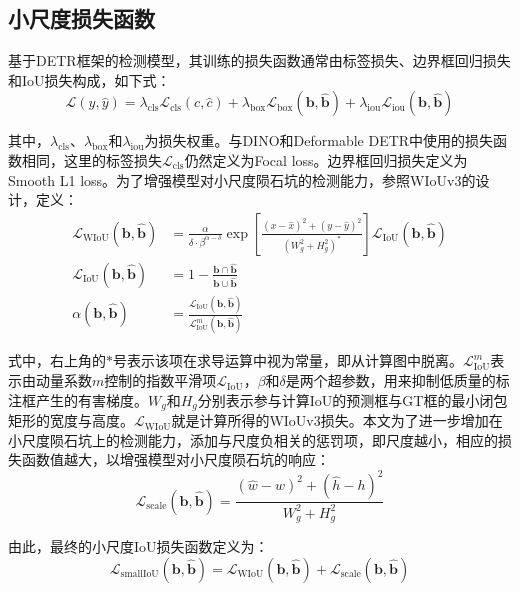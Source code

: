 \subsection{小尺度损失函数}
基于DETR框架的检测模型，其训练的损失函数通常由标签损失、边界框回归损失和IoU损失构成，如下式：
\begin{equation}
    \mathcal{L}(y,\hat{y}) = \lambda_{\text{cls}}\mathcal{L}_{\text{cls}}(c,\hat{c}) +  \lambda_{\text{box}}\mathcal{L}_{\text{box}}(\mathbf{b},\mathbf{\hat{b}}) +  \lambda_{\text{iou}}\mathcal{L}_{\text{iou}}(\mathbf{b},\mathbf{\hat{b}})
  \label{eq:detr-loss}
\end{equation}\par
其中，$\lambda_{\text{cls}}$、$\lambda_{\text{box}}$和$\lambda_{\text{iou}}$为损失权重。与DINO\cite{zhangDINODETRImproved2023}和Deformable DETR\cite{zhuDeformableDETRDeformable2021}中使用的损失函数相同，这里的标签损失$\mathcal{L}_\text{cls}$仍然定义为Focal loss\cite{linFocalLossDense2017}。边界框回归损失定义为Smooth L1 loss。为了增强模型对小尺度陨石坑的检测能力，参照WIoUv3\cite{tongWiseIoUBoundingBox2023}的设计，定义：
\begin{align}
  \mathcal{L}_\text{WIoU}(\mathbf{b},\mathbf{\hat{b}}) &=\frac{\alpha}{\delta\cdot\beta^{\alpha-\delta}}\exp\left[\frac{(x-\hat{x})^2+(y-\hat{y})^2}{(W_g^2+H_g^2)^*}\right]\mathcal{L}_\text{IoU}(\mathbf{b},\mathbf{\hat{b}})\\
  \mathcal{L}_\text{IoU}(\mathbf{b},\mathbf{\hat{b}}) &=1-\frac{\mathbf{b}\cap\mathbf{\hat{b}}}{\mathbf{b}\cup\mathbf{\hat{b}}}\\
  \alpha(\mathbf{b},\mathbf{\hat{b}})&= \frac{\mathcal{L}_\text{IoU}(\mathbf{b},\mathbf{\hat{b}})}{\mathcal{L}^m_\text{IoU}(\mathbf{b},\mathbf{\hat{b}})}
\end{align}\par
式中，右上角的$*$号表示该项在求导运算中视为常量，即从计算图中脱离。$\mathcal{L}^m_\text{IoU}$表示由动量系数$m$控制的指数平滑项$\mathcal{L}_\text{IoU}$，$\beta$和$\delta$是两个超参数，用来抑制低质量的标注框产生的有害梯度。$W_g$和$H_g$分别表示参与计算IoU的预测框与GT框的最小闭包矩形的宽度与高度。$\mathcal{L}_\text{WIoU}$就是计算所得的WIoUv3损失。本文为了进一步增加在小尺度陨石坑上的检测能力，添加与尺度负相关的惩罚项，即尺度越小，相应的损失函数值越大，以增强模型对小尺度陨石坑的响应：
\begin{equation}
  \mathcal{L}_\text{scale}(\mathbf{b},\mathbf{\hat{b}}) = \frac{(\hat{w}-w)^2+(\hat{h}-h)^2}{W_g^2+H_g^2}
\end{equation}\par
由此，最终的小尺度IoU损失函数定义为：
\begin{equation}
  \mathcal{L}_\text{smallIoU}(\mathbf{b},\mathbf{\hat{b}}) = \mathcal{L}_\text{WIoU}(\mathbf{b},\mathbf{\hat{b}})+\mathcal{L}_\text{scale}(\mathbf{b},\mathbf{\hat{b}})
\end{equation}
